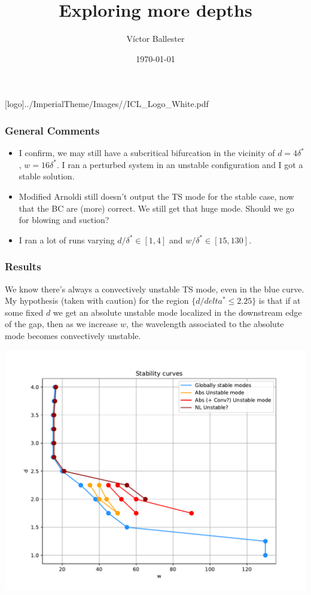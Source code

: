 \documentclass[
  aspectratio=169, %
  t, %
  onlytextwidth, %
  10pt, %
]{beamer}
\title{Exploring more depths} %
\subtitle{} %
\author{Víctor Ballester} %
\date{\today} %
\def\imagefolder{../ImperialTheme/Images/}
\begin{document}
\begingroup
{} %
[logo]{\imagefolder/ICL_Logo_White.pdf} %
\frame[plain, s]{\titlepage} %
\endgroup

\begin{frame}
	\frametitle{General Comments}
	\begin{itemize}
		\item I confirm, we may still have a subcritical bifurcation in the vicinity of $d = 4\delta^*$, $w = 16\delta^*$. I ran a perturbed system in an unstable
		      configuration and I got a stable solution.
		\item Modified Arnoldi still doesn't output the TS mode for the stable case, now that the BC are (more) correct. We still get that huge mode. Should we go for blowing and suction?
		\item I ran a lot of runs varying $d/\delta^* \in [ 1,4 ]$ and $w/\delta^* \in [ 15, 130 ]$.
	\end{itemize}
\end{frame}
\begin{frame}
	\frametitle{Results}
	We know there's always a convectively unstable TS mode, even in the blue curve. My hypothesis (taken with caution) for the region $\{d/delta^*\leq 2.25\}$ is that if at some fixed $d$ we get an absolute unstable mode localized in the downstream edge of the gap, then as we increase $w$, the wavelength associated to the absolute mode becomes convectively unstable. 
	
	\centering
	\includegraphics[width=0.5\linewidth]{Images/stabilitycurves.pdf}
\end{frame}
\end{document}
